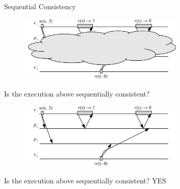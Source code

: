 \begin{frame}{Sequential Consistency}

\begin{overprint}

\begin{figure}
\includegraphics[width=0.7\textwidth]{figs/09/seq-01}
\end{figure}

\begin{example}

\BIL
\item Is the execution above sequentially consistent? 
\EIL

\end{example}

\begin{figure}
\includegraphics[width=0.7\textwidth]{figs/09/seq-01n}
\end{figure}

\begin{example}

\BIL
\item Is the execution above sequentially consistent? YES
\EIL

\end{example}

\end{overprint}

\end{frame}

